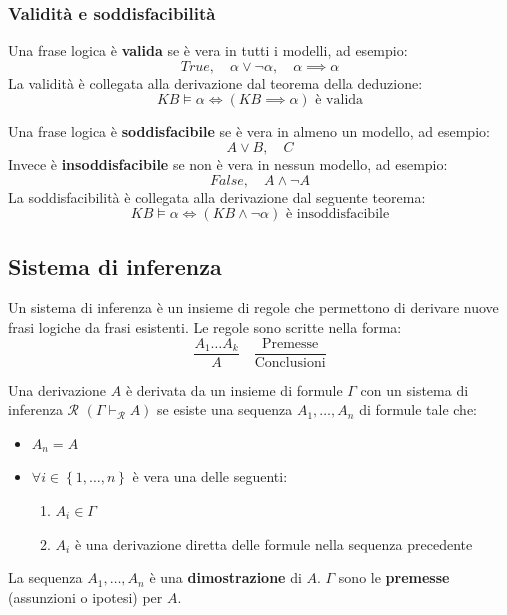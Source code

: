 \documentclass[a4paper]{article}
\begin{document}
\subsubsection{Validità e soddisfacibilità}
Una frase logica è \textbf{valida} se è vera in tutti i modelli, ad esempio:
\[
  True, \quad \alpha \vee \neg \alpha, \quad \alpha \implies \alpha
\] 
La validità è collegata alla derivazione dal teorema della deduzione:
\[
  KB \models \alpha \iff \left( KB \implies \alpha \right) \text{ è valida}
\] 

\vspace{1em}
\noindent
Una frase logica è \textbf{soddisfacibile} se è vera in almeno un modello, ad esempio:
\[
  A \vee B, \quad C
\] 
Invece è \textbf{insoddisfacibile} se non è vera in nessun modello, ad esempio:
\[
  False, \quad A \wedge \neg A
\]
La soddisfacibilità è collegata alla derivazione dal seguente teorema:
\[
  KB \models \alpha \iff \left( KB \wedge \neg \alpha \right) \text{ è insoddisfacibile}
\]

\subsection{Sistema di inferenza}
Un sistema di inferenza è un insieme di regole che permettono di derivare nuove frasi
logiche da frasi esistenti. Le regole sono scritte nella forma:
\[
  \frac{A_1 \ldots A_k}{A} \quad \frac{\text{Premesse}}{\text{Conclusioni}}
\] 
\begin{definition}
  Una derivazione \( A \) è derivata da un insieme di formule \( \Gamma  \) con un
  sistema di inferenza \( \mathcal{R} \) \( \left( \Gamma \vdash_{\mathcal{R}} A \right)  \) 
  se esiste una sequenza \( A_1, \ldots, A_n \) di formule tale che:
  \begin{itemize}
    \item \( A_n = A \)
    \item \( \forall i \in \left\{ 1, \ldots, n \right\} \) è vera una delle seguenti:
      \begin{enumerate}
        \item \( A_i \in \Gamma  \) 
        \item \( A_i \) è una derivazione diretta delle formule nella sequenza precedente
      \end{enumerate}
  \end{itemize}
  La sequenza \( A_1, \ldots, A_n \) è una \textbf{dimostrazione} di \( A \). \( \Gamma  \) 
  sono le \textbf{premesse} (assunzioni o ipotesi) per \( A \).
\end{definition}
\end{document}
